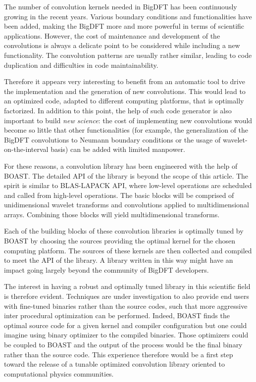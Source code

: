 \documentclass{IEEEtran}
\begin{document}
The number of convolution kernels needed in BigDFT has been continuously
growing in the recent years.  Various boundary conditions and functionalities
have been added, making the BigDFT more and more powerful in terms of
scientific applications.  However, the cost of maintenance and development of
the convolutions is always a delicate point to be considered while including a
new functionality.  The convolution patterns are usually rather similar,
leading to code duplication and difficulties in code maintainability.

Therefore it appears very interesting to benefit from an automatic tool to drive
the implementation and the generation of new convolutions.  This would lead to
an optimized code, adapted to different computing platforms, that is optimally
factorized.  In addition to this point, the help of such code generator is also
important to build \emph{new science}: the cost of implementing new
convolutions would become so little that other functionalities (for example,
the generalization of the BigDFT convolutions to Neumann boundary conditions
or the usage of wavelet-on-the-interval basis) can be added with limited
manpower.

For these reasons, a convolution library has been engineered with the help of
BOAST. The detailed API of the library is beyond the scope of this article. The
spirit is similar to BLAS-LAPACK API, where low-level operations are scheduled
and called from high-level operations. The basic blocks will be comprised of
unidimensional wavelet transforms and convolutions applied to multidimensional
arrays. Combining those blocks will yield multidimensional transforms.

Each of the building blocks of these convolution libraries is optimally tuned by
BOAST by choosing the sources providing the optimal kernel for the chosen
computing platform.  The sources of these kernels are then collected and
compiled to meet the API of the library. A library written in this way might
have an impact going largely beyond the community of BigDFT developers. 

The interest in having a robust and optimally tuned library in this scientific
field is therefore evident. Techniques are under investigation to also provide
end users with fine-tuned binaries rather than the source codes, such that more
aggressive inter procedural optimization can be performed. Indeed, BOAST finds
the optimal source code for a given kernel and compiler configuration but one
could imagine using binary optimizer to the compiled binaries. Those optimizers
could be coupled to BOAST and the output of the process would be the final
binary rather than the source code. This experience therefore would be a first
step toward the release of a tunable optimized convolution library oriented to
computational physics communities.
\end{document}
